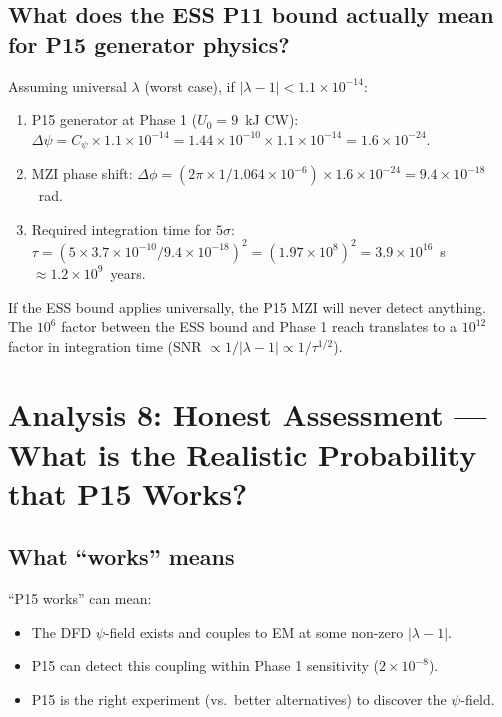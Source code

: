 \documentclass[11pt]{article}
\newcommand{\ee}[1]{\times 10^{#1}}
\newcommand{\lam}{\lambda}
\begin{document}
\subsection{What does the ESS P11 bound actually mean for P15 generator physics?}

Assuming universal $\lam$ (worst case), if $|\lam-1| < 1.1\ee{-14}$:
\begin{enumerate}
\item P15 generator at Phase 1 ($U_0 = 9$~kJ CW):
$\Delta\psi = C_\psi \times 1.1\ee{-14} = 1.44\ee{-10} \times 1.1\ee{-14} = 1.6\ee{-24}$.

\item MZI phase shift:
$\Delta\phi = (2\pi \times 1/1.064\ee{-6}) \times 1.6\ee{-24} = 9.4\ee{-18}$~rad.

\item Required integration time for $5\sigma$:
$\tau = (5 \times 3.7\ee{-10}/9.4\ee{-18})^2 = (1.97\ee{8})^2 = 3.9\ee{16}$~s
$\approx 1.2\ee{9}$~years.
\end{enumerate}

If the ESS bound applies universally, the P15 MZI will never detect anything.
The $10^6$ factor between the ESS bound and Phase 1 reach translates to a
$10^{12}$ factor in integration time (SNR $\propto 1/|\lam-1| \propto 1/\tau^{1/2}$).

\section{Analysis 8: Honest Assessment --- What is the Realistic Probability
that P15 Works?}
\label{sec:honest}

\subsection{What ``works'' means}

``P15 works'' can mean:
\begin{itemize}
\item[A.] The DFD $\psi$-field exists and couples to EM at some non-zero $|\lam-1|$.
\item[B.] P15 can detect this coupling within Phase 1 sensitivity ($2\ee{-8}$).
\item[C.] P15 is the right experiment (vs.\ better alternatives) to discover the $\psi$-field.
\end{itemize}
\end{document}
